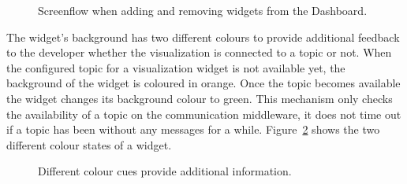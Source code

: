 \begin{figure}[p]
{}
\caption{Screenflow when adding and removing widgets from the Dashboard.}
\label{screenflow}
\end{figure}


The widget's background has two different colours to provide additional feedback to the developer whether the visualization is connected to a topic or not. When the configured topic for a visualization widget is not available yet, the background of the widget is coloured in orange. Once the topic becomes available the widget changes its background colour to green. This mechanism only checks the availability of a topic on the communication middleware, it does not time out if a topic has been without any messages for a while. Figure~\ref{colour_widgets} shows the two different colour states of a widget.

\begin{figure}[htb]
  \centering
  \caption{Different colour cues provide additional information.}
  \label{colour_widgets}
\end{figure}

